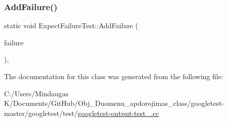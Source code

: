 \mbox{\label{class_expect_failure_test_ab9aeb7820ff7953fc2975ecc5abd046b}} 
\subsubsection{\texorpdfstring{AddFailure()}{AddFailure()}\hspace{0.1cm}{\footnotesize\ttfamily [3/3]}}
{\footnotesize\ttfamily static void Expect\+Failure\+Test\+::\+Add\+Failure (\begin{DoxyParamCaption}\item[{\mbox{\hyperlink{class_expect_failure_test_aad05da10bb15d21a434eba3b37011406}{Failure\+Mode}}}]{failure }\end{DoxyParamCaption})\hspace{0.3cm}{\ttfamily [inline]}, {\ttfamily [static]}}



The documentation for this class was generated from the following file\+:\begin{DoxyCompactItemize}
\item 
C\+:/\+Users/\+Mindaugas K/\+Documents/\+Git\+Hub/\+Obj\+\_\+\+Duomenu\+\_\+apdorojimas\+\_\+class/googletest-\/master/googletest/test/\mbox{\hyperlink{googletest-master_2googletest_2test_2googletest-output-test___8cc}{googletest-\/output-\/test\+\_\+.\+cc}}\end{DoxyCompactItemize}
